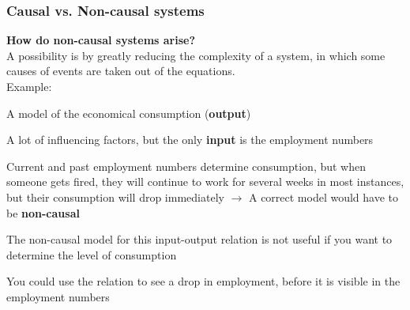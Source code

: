 \documentclass{beamer}
\begin{document}

\begin{frame}
\frametitle{Causal vs. Non-causal systems}
\textbf{How do non-causal systems arise?}\\
\medskip
A possibility is by greatly reducing the complexity of a system, in which some causes of events are taken out of the equations.\\
Example:\\
\begin{itemize}
\small{
\item A model of the economical consumption (\textbf{output})
\item A lot of influencing factors, but the only \textbf{input} is the employment numbers
\item Current and past employment numbers determine consumption, but when someone gets fired, they will continue to work for several weeks in most instances, but their consumption will drop immediately
$\rightarrow$ A correct model would have to be \textbf{non-causal}
\item The non-causal model for this input-output relation is not useful if you want to determine the level of consumption
\item You could use the relation to see a drop in employment, before it is visible in the employment numbers}
\end{itemize}
\end{frame}

\end{document}
